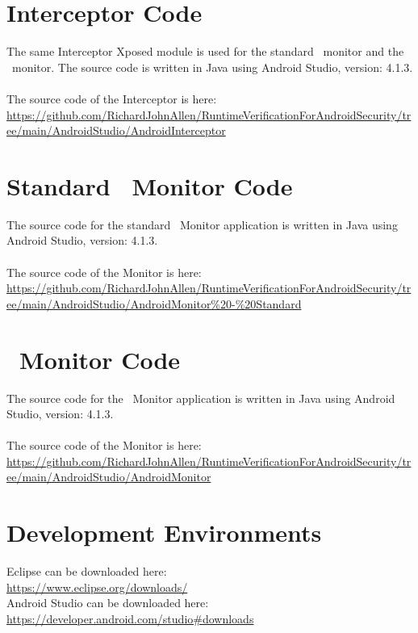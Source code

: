 \newpage

\section{Interceptor Code}
\label{app:InterceptorCode}

The same Interceptor Xposed module is used for the standard \RH\ monitor and the \RRH\ monitor.  The source code is written in Java using Android Studio, version: 4.1.3.\\
\\
\noindent The source code of the Interceptor is here:\\
\noindent \url{https://github.com/RichardJohnAllen/RuntimeVerificationForAndroidSecurity/tree/main/AndroidStudio/AndroidInterceptor}

\section{Standard \RH\ Monitor Code}
\label{app:StandardRHMonitorCode}

The source code for the standard \RH\ Monitor application is written in Java using Android Studio, version: 4.1.3.\\
\\
\noindent The source code of the Monitor is here:\\
\noindent \url{https://github.com/RichardJohnAllen/RuntimeVerificationForAndroidSecurity/tree/main/AndroidStudio/AndroidMonitor\%20-\%20Standard}

\section{\RRH\ Monitor Code}
\label{app:MonitorCode}

The source code for the \RRH\ Monitor application is written in Java using Android Studio, version: 4.1.3.\\
\\
\noindent The source code of the Monitor is here:\\
\noindent \url{https://github.com/RichardJohnAllen/RuntimeVerificationForAndroidSecurity/tree/main/AndroidStudio/AndroidMonitor}

\section{Development Environments}

\noindent Eclipse can be downloaded here:\\
\noindent \url{https://www.eclipse.org/downloads/}\\

\noindent Android Studio can be downloaded here:\\
\noindent \url{https://developer.android.com/studio#downloads}\\
